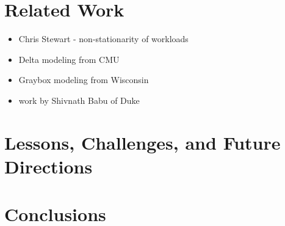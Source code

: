 \documentclass{acm_proc_article-sp}
\begin{document}
\section{Related Work}

\begin{itemize}
   \item Chris Stewart - non-stationarity of workloads
   \item Delta modeling from CMU
   \item Graybox modeling from Wisconsin
   \item work by Shivnath Babu of Duke
\end{itemize}


\section{Lessons, Challenges, and Future Directions}

\section{Conclusions}



%

%
%

\balancecolumns
\end{document}
